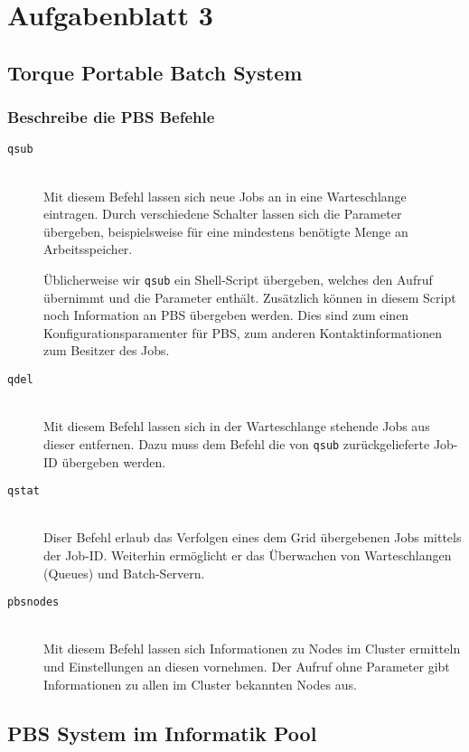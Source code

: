 \section{Aufgabenblatt 3}

\subsection{Torque Portable Batch System}
\subsubsection{Beschreibe die PBS Befehle}

\begin{description}
	\item[\texttt{qsub}] \hfill \\
		Mit diesem Befehl lassen sich neue Jobs an in eine Warteschlange eintragen.
		Durch verschiedene Schalter lassen sich die Parameter \"ubergeben,
		beispielsweise für eine mindestens benötigte Menge an Arbeitsspeicher.

		Üblicherweise wir \texttt{qsub} ein Shell-Script übergeben,
		welches den Aufruf übernimmt und die Parameter enthält.
		Zusätzlich können in diesem Script noch Information an PBS übergeben werden.
		Dies sind zum einen Konfigurationsparamenter für PBS,
		zum anderen Kontaktinformationen zum Besitzer des Jobs.

	\item[\texttt{qdel}] \hfill \\
		Mit diesem Befehl lassen sich in der Warteschlange stehende Jobs aus dieser entfernen.
		Dazu muss dem Befehl die von \texttt{qsub} zurückgelieferte Job-ID übergeben werden.

	\item[\texttt{qstat}] \hfill \\
		Diser Befehl erlaub das Verfolgen eines dem Grid übergebenen Jobs mittels der Job-ID.
		Weiterhin ermöglicht er das Überwachen von Warteschlangen (Queues) und
		Batch-Servern.

	\item[\texttt{pbsnodes}] \hfill \\
		Mit diesem Befehl lassen sich Informationen zu Nodes im Cluster ermitteln und
		Einstellungen an diesen vornehmen.
		Der Aufruf ohne Parameter gibt Informationen zu allen im Cluster bekannten
		Nodes aus.
\end{description}


\subsection{PBS System im Informatik Pool}
